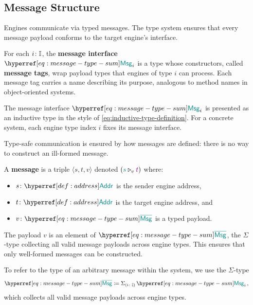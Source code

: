 \documentclass[
  a4paper,        %
  techreport,     %
]{art}
\begin{document}
\subsection{Message Structure}\label{sec:message-structure}

Engines communicate via typed messages. The type system ensures that every
message payload conforms to the target engine's interface.

\begin{definition}\label{def:message-interface}%
For each $\typing{i}{\EngIdx}$, the \textbf{message interface} $\msgtype{i}$ is
a type whose constructors, called \textbf{message tags}, wrap payload types that
engines of type $i$ can process. Each message tag carries a name describing its
purpose, analogous to method names in object-oriented systems.
\end{definition}

The message interface $\msgtype{i}$ is presented as an inductive type in the
style of \eqref{eq:inductive-type-definition}. For a concrete system, each
engine type index $i$ fixes its message interface.

Type-safe communication is ensured by how messages are defined: there is no way
to construct an ill-formed message.

\begin{definition}\label{def:messages}%
A \textbf{message} is a triple $\langle s, t, v \rangle$ denoted
$\msgpacket{s}{t}{v}$ where:
\begin{itemize}
    \item $\typing{s}{\Address}$ is the sender engine address,
    \item $\typing{t}{\Address}$ is the target engine address, and
    \item $\typing{v}{\TotalMsg}$ is a typed payload.
\end{itemize}
\end{definition}

The payload $v$ is an element of $\TotalMsg$, the $\Sigma$-type collecting all
valid message payloads across engine types. This ensures that only well-formed
messages can be constructed.

To refer to the type of an arbitrary message within the system, we use the
$\Sigma$-type
\begin{equation}\label{eq:message-type-sum}
  \defequal{\TotalMsg}{\Sigma_{(\typing{i}{\EngIdx})}\,\msgtype{i}}\,,
\end{equation}
which collects all valid message payloads across engine types.
\end{document}
